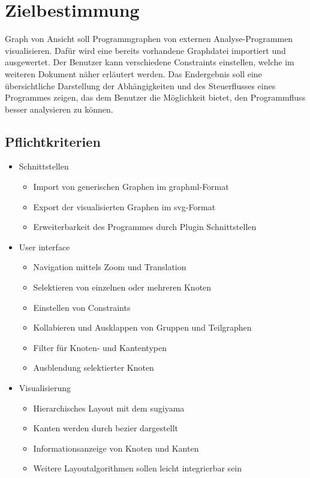 \chapter{Zielbestimmung}

Graph von Ansicht soll Programmgraphen von externen Analyse-Programmen visualisieren. Dafür wird eine bereits vorhandene Graphdatei importiert und ausgewertet. Der Benutzer kann verschiedene Constraints einstellen, welche im weiteren Dokument näher erläutert werden. 
Das Endergebnis soll eine übersichtliche Darstellung der Abhängigkeiten und des Steuerflusses eines Programmes zeigen, das dem Benutzer die Möglichkeit bietet, den Programmfluss besser analysieren zu können.

\section{Pflichtkriterien}

\begin{itemize}
\item Schnittstellen
\begin{itemize}
\item Import von generischen Graphen im \gls{graphml}-Format
\item Export der visualisierten Graphen im \gls{svg}-Format
\item Erweiterbarkeit des Programmes durch Plugin Schnittstellen
\end{itemize}
\item User interface
\begin{itemize}
\item Navigation mittels Zoom und Translation
\item Selektieren von einzelnen oder mehreren Knoten
\item Einstellen von Constraints
\item Kollabieren und Ausklappen von Gruppen und Teilgraphen
\item Filter für Knoten- und Kantentypen
\item Ausblendung selektierter Knoten
\end{itemize}
\item Visualisierung
\begin{itemize}
\item Hierarchisches Layout mit dem \gls{sugiyama}
\item Kanten werden durch \gls{bezier} dargestellt
\item Informationsanzeige von Knoten und Kanten
\item Weitere Layoutalgorithmen sollen leicht integrierbar sein 
\end{itemize}
\end{itemize}

